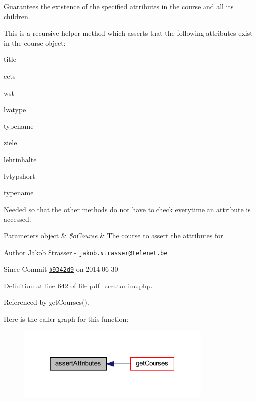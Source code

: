 Guarantees the existence of the specified attributes in the course and all its children. 

This is a recursive helper method which asserts that the following attributes exist in the course object\+:
\begin{DoxyItemize}
\item title
\item ects
\item wst
\item lvatype
\item typename
\item ziele
\item lehrinhalte
\item lvtypshort
\item typename
\end{DoxyItemize}

Needed so that the other methods do not have to check everytime an attribute is accessed.


\begin{DoxyParams}[1]{Parameters}
object & {\em \$o\+Course} & The course to assert the attributes for\\
\hline
\end{DoxyParams}
\begin{DoxyAuthor}{Author}
Jakob Strasser -\/ \href{mailto:jakob.strasser@telenet.be}{\tt jakob.\+strasser@telenet.\+be} 
\end{DoxyAuthor}
\begin{DoxySince}{Since}
Commit \href{http://github.com/TheJake123/DrupalModul/commit/b9342d941b3f93e212f3f6af0823a07524dd5954}{\tt b9342d9} on 2014-\/06-\/30 
\end{DoxySince}


Definition at line 642 of file pdf\+\_\+creator.\+inc.\+php.



Referenced by get\+Courses().



Here is the caller graph for this function\+:
\nopagebreak
\begin{figure}[H]
\begin{center}
\leavevmode
\includegraphics[width=268pt]{classoverview_p_d_f_a56f3ef341ae39bb7b4c34a700b33eac1_icgraph}
\end{center}
\end{figure}



